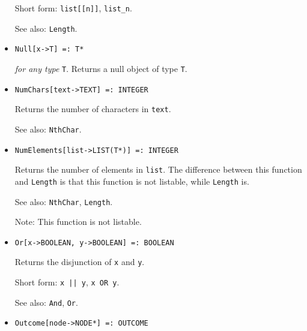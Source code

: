 \begin{itemize}
{\it for all types} {\tt T}
\bd
Returns the \verb+n+th element of \verb+list+.
By convention, the first element of a list is indexed by 1.
It is an error if \verb+n+ is nonpositive, or if \verb+n+ is greater
than the number of elements in \verb+list+.
\item [Short form:] \verb+list[[n]]+, \verb+list_n+.
\item [See also:] \verb+Length+.
\ed

\item{}
\protect \large \begin{verbatim}
Null[x->T] =: T*
\end{verbatim}\normalsize

{\it for any type } {\tt T}.
\bd
Returns a null object of type \verb+T+.  
\ed

\item{}
\protect \large \begin{verbatim}
NumChars[text->TEXT] =: INTEGER
\end{verbatim}\normalsize

\bd
Returns the number of characters in \verb+text+.
\item [See also:] \verb+NthChar+.
\ed

\item{}
\protect \large \begin{verbatim}
NumElements[list->LIST(T*)] =: INTEGER
\end{verbatim}\normalsize

\bd
Returns the number of elements in \verb+list+.  The difference between
this function and \verb+Length+ is that this function is not listable,
while \verb+Length+ is.  
\item
[See also:] \verb+NthChar+, \verb+Length+.
\item
[Note:] This function is not listable. 
\ed


\item{} 
\protect \large \begin{verbatim}
Or[x->BOOLEAN, y->BOOLEAN] =: BOOLEAN
\end{verbatim} \normalsize
  
\bd
Returns the disjunction of \verb+x+ and \verb+y+.
\item
[Short form:] \verb+x || y+, \verb+x OR y+.
\item [See also:] \verb+And+, \verb+Or+.
\ed

\item{}
\protect \large \begin{verbatim}
Outcome[node->NODE*] =: OUTCOME
\end{verbatim}\normalsize


\end{itemize}

